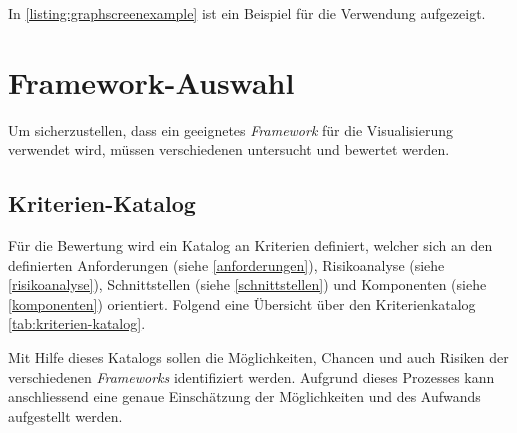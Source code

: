 In \autoref{listing:graphscreenexample} ist ein Beispiel für die Verwendung aufgezeigt. 


\section{Framework-Auswahl}
Um sicherzustellen, dass ein geeignetes \textit{Framework} für die Visualisierung verwendet wird, müssen verschiedenen untersucht und bewertet werden.
\subsection{Kriterien-Katalog}
Für die Bewertung wird ein Katalog an Kriterien definiert, welcher sich an den definierten Anforderungen (siehe \autoref{anforderungen}), Risikoanalyse (siehe \autoref{risikoanalyse}), Schnittstellen (siehe \autoref{schnittstellen}) und Komponenten (siehe \autoref{komponenten}) orientiert. Folgend eine Übersicht über den Kriterienkatalog \autoref{tab:kriterien-katalog}. 

Mit Hilfe dieses Katalogs sollen die Möglichkeiten, Chancen und auch Risiken der verschiedenen \textit{Frameworks} identifiziert werden. Aufgrund dieses Prozesses kann anschliessend eine genaue Einschätzung der Möglichkeiten und des Aufwands aufgestellt werden.

